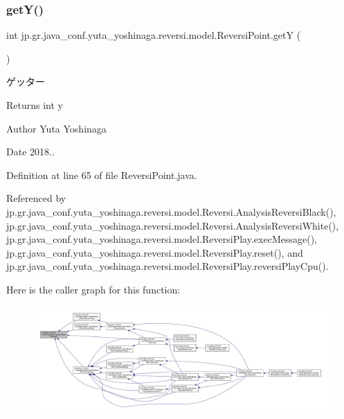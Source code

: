 \subsubsection{\texorpdfstring{get\+Y()}{getY()}}
{\footnotesize\ttfamily int jp.\+gr.\+java\+\_\+conf.\+yuta\+\_\+yoshinaga.\+reversi.\+model.\+Reversi\+Point.\+getY (\begin{DoxyParamCaption}{ }\end{DoxyParamCaption})}



ゲッター 

\begin{DoxyReturn}{Returns}
int y 
\end{DoxyReturn}
\begin{DoxyAuthor}{Author}
Yuta Yoshinaga 
\end{DoxyAuthor}
\begin{DoxyDate}{Date}
2018.. 
\end{DoxyDate}


Definition at line 65 of file Reversi\+Point.\+java.



Referenced by jp.\+gr.\+java\+\_\+conf.\+yuta\+\_\+yoshinaga.\+reversi.\+model.\+Reversi.\+Analysis\+Reversi\+Black(), jp.\+gr.\+java\+\_\+conf.\+yuta\+\_\+yoshinaga.\+reversi.\+model.\+Reversi.\+Analysis\+Reversi\+White(), jp.\+gr.\+java\+\_\+conf.\+yuta\+\_\+yoshinaga.\+reversi.\+model.\+Reversi\+Play.\+exec\+Message(), jp.\+gr.\+java\+\_\+conf.\+yuta\+\_\+yoshinaga.\+reversi.\+model.\+Reversi\+Play.\+reset(), and jp.\+gr.\+java\+\_\+conf.\+yuta\+\_\+yoshinaga.\+reversi.\+model.\+Reversi\+Play.\+reversi\+Play\+Cpu().

Here is the caller graph for this function\+:
\nopagebreak
\begin{figure}[H]
\begin{center}
\leavevmode
\includegraphics[width=350pt]{classjp_1_1gr_1_1java__conf_1_1yuta__yoshinaga_1_1reversi_1_1model_1_1_reversi_point_a798959fea536c8bbbcaa9e7b447037ea_icgraph}
\end{center}
\end{figure}
\mbox{\label{classjp_1_1gr_1_1java__conf_1_1yuta__yoshinaga_1_1reversi_1_1model_1_1_reversi_point_a24da8d887cae320a2ca8b4c80665227c}} 
